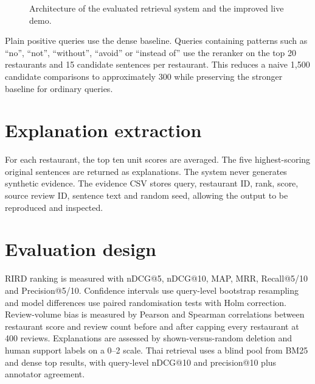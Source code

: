\begin{figure}[H]
\centering
{}
\caption{Architecture of the evaluated retrieval system and the improved live demo.}
\label{fig:architecture}
\end{figure}

Plain positive queries use the dense baseline. Queries containing patterns such as ``no'',
``not'', ``without'', ``avoid'' or ``instead of'' use the reranker on the top 20 restaurants and
15 candidate sentences per restaurant. This reduces a naive 1,500 candidate comparisons to
approximately 300 while preserving the stronger baseline for ordinary queries.

\section{Explanation extraction}
For each restaurant, the top ten unit scores are averaged. The five highest-scoring original
sentences are returned as explanations. The system never generates synthetic evidence. The
evidence CSV stores query, restaurant ID, rank, score, source review ID, sentence text and
random seed, allowing the output to be reproduced and inspected.

\section{Evaluation design}
RIRD ranking is measured with nDCG@5, nDCG@10, MAP, MRR, Recall@5/10 and Precision@5/10.
Confidence intervals use query-level bootstrap resampling and model differences use paired
randomisation tests with Holm correction. Review-volume bias is measured by Pearson and
Spearman correlations between restaurant score and review count before and after capping every
restaurant at 400 reviews. Explanations are assessed by shown-versus-random deletion and human
support labels on a 0--2 scale. Thai retrieval uses a blind pool from BM25 and dense top
results, with query-level nDCG@10 and precision@10 plus annotator agreement.
